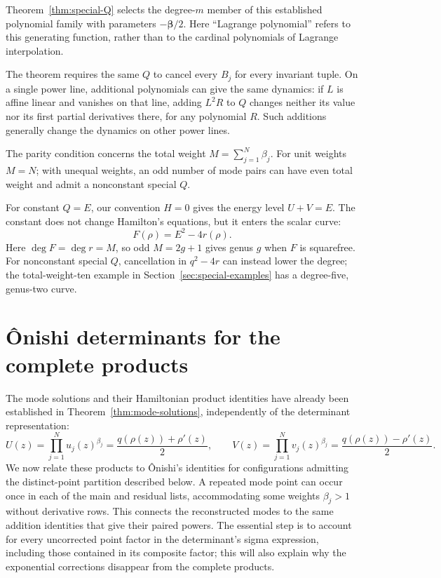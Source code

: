 \documentclass[11pt]{article}
\begin{document}
Theorem~\ref{thm:special-Q} selects the degree-$m$ member of this
established polynomial family with parameters $-\boldsymbol\beta/2$.
Here
``Lagrange polynomial'' refers to this generating function, rather than
to the cardinal polynomials of Lagrange interpolation.

The theorem requires the same $Q$ to cancel every $B_j$ for every invariant
tuple. On a single power line, additional polynomials can give the same
dynamics: if $L$ is affine linear and vanishes on that line, adding
$L^2R$ to $Q$ changes neither its value nor its first partial derivatives
there, for any polynomial $R$. Such additions generally change the
dynamics on other power lines.

The parity condition concerns the total weight $M=\sum_{j=1}^{N}\beta_j$.
For unit weights $M=N$; with unequal weights, an odd number of mode pairs
can have even total weight and admit a nonconstant special $Q$.

For constant $Q=E$, our convention $H=0$ gives the energy level $U+V=E$.
The constant does not change Hamilton's equations, but it enters the scalar
curve:
\begin{equation}\label{eq:special-constant-F}
 F(\rho)=E^2-4r(\rho).
\end{equation}
Here $\deg F=\deg r=M$, so odd $M=2g+1$ gives genus $g$ when $F$ is
squarefree. For nonconstant special $Q$, cancellation in $q^2-4r$ can
instead lower the degree; the total-weight-ten example in
Section~\ref{sec:special-examples} has a degree-five, genus-two curve.

\section{\^Onishi determinants for the complete products}\label{sec:onishi-products}

The mode solutions and their Hamiltonian product identities have already been established in Theorem~\ref{thm:mode-solutions}, independently of the determinant representation:
\[
U(z)=\prod_{j=1}^{N} u_j(z)^{\beta_j}=\frac{q(\rho(z))+\rho'(z)}2,\qquad
V(z)=\prod_{j=1}^{N} v_j(z)^{\beta_j}=\frac{q(\rho(z))-\rho'(z)}2.
\]
We now relate these products to \^Onishi's identities for configurations admitting the distinct-point partition described below. A repeated mode point can occur once in each of the main and residual lists, accommodating some weights $\beta_j>1$ without derivative rows. This connects the reconstructed modes to the same addition identities that give their paired powers. The essential step is to account for every uncorrected point factor in the determinant's sigma expression, including those contained in its composite factor; this will also explain why the exponential corrections disappear from the complete products.
\end{document}
